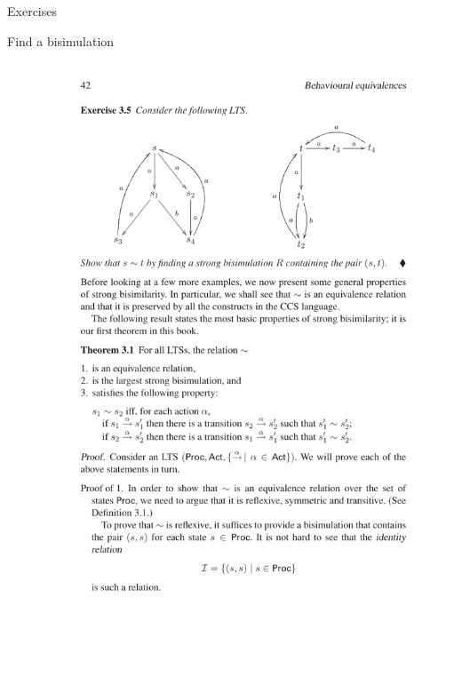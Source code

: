 \documentclass[aspectratio=169]{beamer}
\begin{document}
\begin{slide}{Exercises}
\begin{exampleblock}{\exercise Find a bisimulation}
{  \includegraphics{images/LTS-2}
}
\end{exampleblock}
\end{slide}



\end{document}
